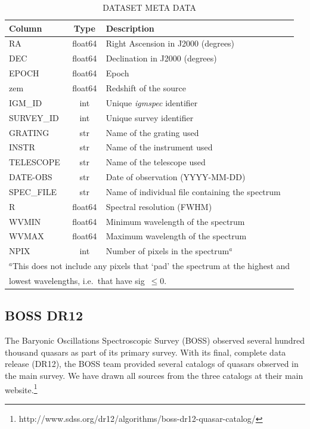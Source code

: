 \documentclass[12pt]{elsarticle}
\begin{document}
\begin{table}[ht]
\caption{DATASET META DATA\label{tab:meta_spec}}
\footnotesize
\begin{tabular}{lcl}
Column & Type  & Description \\
\hline
RA           & float64 & Right Ascension in J2000 (degrees) \\
DEC          & float64 & Declination in J2000 (degrees) \\
EPOCH        & float64 & Epoch \\
zem          & float64 & Redshift of the source \\
IGM\_ID      & int     & Unique {\it igmspec} identifier \\
SURVEY\_ID   & int     & Unique survey identifier \\
GRATING      & str     & Name of the grating used \\
INSTR        & str     & Name of the instrument used \\
TELESCOPE    & str     & Name of the telescope used \\
DATE-OBS     & str     & Date of observation (YYYY-MM-DD) \\
SPEC\_FILE   & str     & Name of individual file containing the spectrum \\
R            & float64 & Spectral resolution (FWHM) \\
WVMIN        & float64 & Minimum wavelength of the spectrum \\
WVMAX        & float64 & Maximum wavelength of the spectrum \\
NPIX         & int     & Number of pixels in the spectrum$^a$ \\
\hline
\multicolumn{3}{l}{
{$^a$}{This does not include any pixels that `pad' the
spectrum at the highest and 
}} \\
\multicolumn{3}{l}{lowest wavelengths,  i.e.\ that have sig~$\le 0$.}
\end{tabular}
\end{table}



\subsection{BOSS DR12}

The Baryonic Oscillations Spectroscopic Survey (BOSS)
observed several hundred thousand quasars as part of its
primary survey.  With its final, complete data release
(DR12), the BOSS team provided several catalogs of quasars
observed in the main survey.  We have drawn all sources
from the three catalogs at their main website.\footnote{http://www.sdss.org/dr12/algorithms/boss-dr12-quasar-catalog/}
\end{document}
